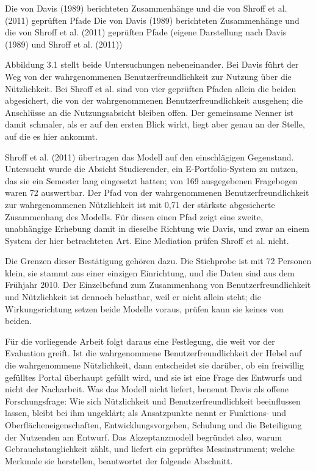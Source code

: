 %
{Die von Davis (1989) berichteten Zusammenhänge und die von Shroff et al. (2011) geprüften Pfade}%
{Die von Davis (1989) berichteten Zusammenhänge und die von Shroff et al. (2011) geprüften Pfade (eigene Darstellung nach Davis (1989) und Shroff et al. (2011))}

Abbildung 3.1 stellt beide Untersuchungen nebeneinander. Bei Davis führt der Weg von der wahrgenommenen Benutzerfreundlichkeit zur Nutzung über die Nützlichkeit. Bei Shroff et al. sind von vier geprüften Pfaden allein die beiden abgesichert, die von der wahrgenommenen Benutzerfreundlichkeit ausgehen; die Anschlüsse an die Nutzungsabsicht bleiben offen. Der gemeinsame Nenner ist damit schmaler, als er auf den ersten Blick wirkt, liegt aber genau an der Stelle, auf die es hier ankommt.

Shroff et al. (2011) übertragen das Modell auf den einschlägigen Gegenstand. Untersucht wurde die Absicht Studierender, ein E-Portfolio-System zu nutzen, das sie ein Semester lang eingesetzt hatten; von 169 ausgegebenen Fragebogen waren 72 auswertbar. Der Pfad von der wahrgenommenen Benutzerfreundlichkeit zur wahrgenommenen Nützlichkeit ist mit 0,71 der stärkste abgesicherte Zusammenhang des Modells. Für diesen einen Pfad zeigt eine zweite, unabhängige Erhebung damit in dieselbe Richtung wie Davis, und zwar an einem System der hier betrachteten Art. Eine Mediation prüfen Shroff et al. nicht.

Die Grenzen dieser Bestätigung gehören dazu. Die Stichprobe ist mit 72 Personen klein, sie stammt aus einer einzigen Einrichtung, und die Daten sind aus dem Frühjahr 2010. Der Einzelbefund zum Zusammenhang von Benutzerfreundlichkeit und Nützlichkeit ist dennoch belastbar, weil er nicht allein steht; die Wirkungsrichtung setzen beide Modelle voraus, prüfen kann sie keines von beiden.

Für die vorliegende Arbeit folgt daraus eine Festlegung, die weit vor der Evaluation greift. Ist die wahrgenommene Benutzerfreundlichkeit der Hebel auf die wahrgenommene Nützlichkeit, dann entscheidet sie darüber, ob ein freiwillig gefülltes Portal überhaupt gefüllt wird, und sie ist eine Frage des Entwurfs und nicht der Nacharbeit. Was das Modell nicht liefert, benennt Davis als offene Forschungsfrage: Wie sich Nützlichkeit und Benutzerfreundlichkeit beeinflussen lassen, bleibt bei ihm ungeklärt; als Ansatzpunkte nennt er Funktions- und Oberflächeneigenschaften, Entwicklungsvorgehen, Schulung und die Beteiligung der Nutzenden am Entwurf. Das Akzeptanzmodell begründet also, warum Gebrauchstauglichkeit zählt, und liefert ein geprüftes Messinstrument; welche Merkmale sie herstellen, beantwortet der folgende Abschnitt.

